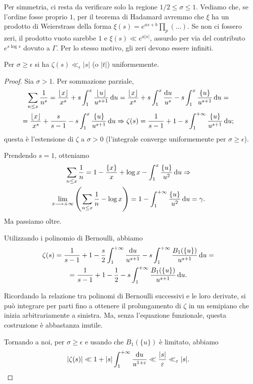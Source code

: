 Per simmetria, ci resta da verificare solo la regione $1/2 \le \sigma \le 1$. Vediamo che, se l'ordine fosse proprio $1$, per il teorema di Hadamard avremmo che $\xi$ ha un prodotto di Weierstrass della forma $\displaystyle \xi(s)=e^{as+b}\prod_p (\dots)$. Se non ci fossero zeri, il prodotto vuoto sarebbe $1$ e $\xi(s) \ll e^{a|s|}$, assurdo per via del contributo $e^{s\log{s}}$ dovuto a $\Gamma$. Per lo stesso motivo, gli zeri devono essere infiniti.

\begin{lm} \label{lls}
  Per $\sigma \ge \epsilon$ si ha $\zeta(s) \ll_{\epsilon} |s|$ (o $|t|$) uniformemente.
\end{lm}

\begin{proof}
  Sia $\sigma>1$. Per sommazione parziale,
  \begin{gather*}
    \sum_{n \le x} \frac{1}{n^s}=\frac{\lfloor x\rfloor}{x^s}+s\int_1^x \frac{\lfloor u\rfloor}{u^{s+1}}\mathop{}\!\mathrm{d} u=\frac{\lfloor x\rfloor}{x^s}+s\int_1^x \frac{\mathop{}\!\mathrm{d} u}{u^s}-s\int_1^x \frac{\{u\}}{u^{s+1}}\mathop{}\!\mathrm{d} u= \\
    =\frac{\lfloor x\rfloor}{x^s}+\frac{s}{s-1}-s\int_1^x \frac{\{u\}}{u^{s+1}}\mathop{}\!\mathrm{d} u \Rightarrow \zeta(s)=\frac{1}{s-1}+1-s\int_1^{+\infty} \frac{\{u\}}{u^{s+1}}\mathop{}\!\mathrm{d} u;
  \end{gather*}
  questa è l'estensione di $\zeta$ a $\sigma>0$ (l'integrale converge uniformemente per $\sigma \ge \epsilon$).
  \begin{oss}
    Prendendo $s=1$, otteniamo
    \begin{gather*}
      \sum_{n \le x} \frac{1}{n}=1-\frac{\{x\}}{x}+\log{x}-\int_1^x \frac{\{u\}}{u^2}\mathop{}\!\mathrm{d} u \Rightarrow \\
      \lim_{x \longrightarrow +\infty} \left(\sum_{n \le x} \frac{1}{n}-\log{x}\right)=1-\int_1^{+\infty} \frac{\{u\}}{u^2}\mathop{}\!\mathrm{d} u=\gamma.
    \end{gather*}
    Ma passiamo oltre.
  \end{oss}

  Utilizzando i polinomio di Bernoulli, abbiamo
  \begin{gather*}
    \zeta(s)=\frac{1}{s-1}+1-\frac{s}{2}\int_1^{+\infty} \frac{\mathop{}\!\mathrm{d} u}{u^{s+1}}-s\int_1^{+\infty} \frac{B_1(\{u\})}{u^{s+1}}\mathop{}\!\mathrm{d} u= \\
    =\frac{1}{s-1}+1-\frac{1}{2}-s\int_1^{+\infty} \frac{B_1(\{u\})}{u^{s+1}}\mathop{}\!\mathrm{d} u.
  \end{gather*}

  \begin{oss}
    Ricordando la relazione tra polinomi di Bernoulli successivi e le loro derivate, si può integrare per parti fino a ottenere il prolungamento di $\zeta$ in un semipiano che inizia arbitrariamente a sinistra. Ma, senza l'equazione funzionale, questa costruzione è abbastanza inutile.
  \end{oss}

  Tornando a noi, per $\sigma \ge \epsilon$ e usando che $B_1(\{u\})$ è limitato, abbiamo
  $$|\zeta(s)| \ll 1+|s|\int_1^{+\infty} \frac{\mathop{}\!\mathrm{d} u}{u^{1+\varepsilon}} \ll \frac{|s|}{\varepsilon} \ll_{\varepsilon} |s|.$$
\end{proof}

